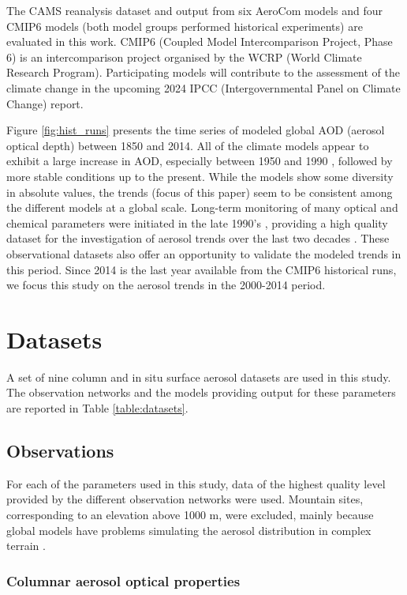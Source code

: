 \documentclass[acp, manuscript]{copernicus}
\begin{document}
The CAMS reanalysis dataset and output from six AeroCom models and four CMIP6 models (both model groups performed historical experiments) are evaluated in this work. CMIP6 (Coupled Model Intercomparison Project, Phase 6) is an intercomparison project organised by the WCRP (World Climate Research Program). Participating models will contribute to the assessment of the climate change in the upcoming 2024 IPCC (Intergovernmental Panel on Climate Change) report.

Figure \ref{fig:hist_runs} presents the time series of modeled global AOD (aerosol optical depth) between 1850 and 2014. All of the climate models appear to exhibit a large increase in AOD, especially between 1950 and 1990 \citep{tegen-jgr-2000}, followed by more stable conditions up to the present. While the models show some diversity in absolute values, the trends (focus of this paper) seem to be consistent among the different models at a global scale. Long-term  monitoring of many optical and chemical parameters were initiated in the late 1990's \citep[e.g.,][]{holben2001emerging,laj-2019-499}, providing a high quality dataset for the investigation of aerosol trends over the last two decades \citep[e.g.,][]{collaudcoen-2019,HAND2019117025,aas2019global}.  These observational datasets also offer an opportunity to validate the modeled trends in this period. Since 2014 is the last year available from the CMIP6 historical runs, we focus this study on the aerosol trends in the 2000-2014 period.


\section{Datasets}
A set of nine column and in situ surface aerosol datasets are used in this study. The observation networks and the models providing output for these parameters are reported in Table \ref{table:datasets}.


\subsection{Observations}

For each of the parameters used in this study, data of the highest quality level provided by the different observation networks were used. Mountain sites, corresponding to an elevation above 1000 m, were excluded, mainly because global models have problems simulating the aerosol distribution in complex terrain \citep{kinne2013mac}.

\subsubsection{Columnar aerosol optical properties}
\end{document}
